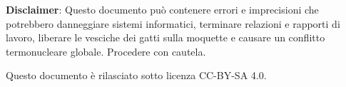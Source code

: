 \documentclass[answers,a4paper,12pt]{exam}
\begin{document}
\textbf{Disclaimer}:  Questo documento può contenere errori e imprecisioni che potrebbero danneggiare sistemi informatici, terminare relazioni e rapporti di lavoro, liberare le vesciche dei gatti sulla moquette e causare un conflitto termonucleare globale.  
Procedere con cautela.

Questo documento è rilasciato sotto licenza CC-BY-SA 4.0. \faCreativeCommons\ \faCreativeCommonsBy\ \faCreativeCommonsSa
\end{document}
